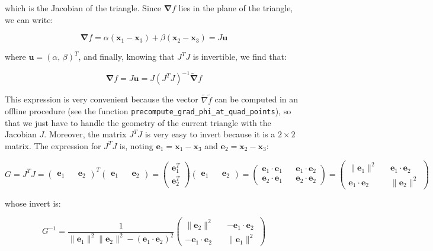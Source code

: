 \documentclass{article}
\theoremstyle{definition}
\theoremstyle{proposition}
\theoremstyle{theorem}
\theoremstyle{remark}
\theoremstyle{corollary}  %
\theoremstyle{exercise}
\theoremstyle{lemma}
\begin{document}
which is the Jacobian of the triangle. Since $\bm \nabla f$ lies in the plane of the triangle, we can write:

$$\bm \nabla f = \alpha (\bm x_1 - \bm x_3) + \beta (\bm x_2 - \bm x_3) = J \bm u $$

where $\bm u = (\alpha, \, \beta)^T$, and finally, knowing that $J^TJ$ is invertible, we find that:

$$\bm \nabla f = J \bm u = J(J^TJ)^{-1}  \widetilde{\bm \nabla} f$$

This expression is very convenient because the vector $\widetilde{\nabla} \tilde{f}$ can be computed in an offline procedure (see the function \texttt{precompute\_grad\_phi\_at\_quad\_points}), so that we just have to handle the geometry of the current triangle with the Jacobian $J$. Moreover, the matrix $J^TJ$ is very easy to invert because it is a $2 \times 2$ matrix. The expression for $J^TJ$ is, noting $\bm e_1 = \bm x_1 - \bm x_3$ and $\bm e_2 = \bm x_2 - \bm x_3$:

$$G = J^TJ = \begin{pmatrix}
    \bm e_1 && \bm e_2
\end{pmatrix}^T \begin{pmatrix}
    \bm e_1 && \bm e_2
\end{pmatrix} = \begin{pmatrix}
    \bm e_1^T \\
    \bm e_2^T 
\end{pmatrix} \begin{pmatrix}
    \bm e_1 && \bm e_2
\end{pmatrix} = \begin{pmatrix}
    \bm e_1 \cdot \bm e_1 && \bm e_1 \cdot \bm e_2 \\ 
    \bm e_2 \cdot \bm e_1 && \bm e_2 \cdot \bm e_2
\end{pmatrix} =\begin{pmatrix}
    \|\bm e_1\|^2 && \bm e_1 \cdot \bm e_2 \\ 
    \bm e_1 \cdot \bm e_2 && \|\bm e_2\|^2
\end{pmatrix} $$

whose invert is: 

$$G^{-1} = \frac{1}{\|\bm e_1\|^2\|\bm e_2\|^2 - (\bm e_1 \cdot \bm e_2)^2} 
\begin{pmatrix}
    \|\bm e_2\|^2 && -\bm e_1 \cdot \bm e_2 \\ 
    -\bm e_1 \cdot \bm e_2 && \|\bm e_1\|^2
\end{pmatrix}$$
\end{document}
